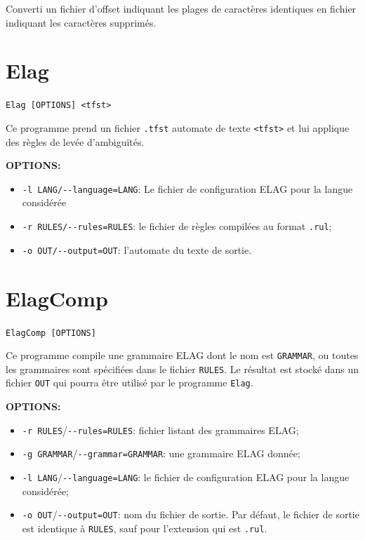 Converti un fichier d'offset indiquant les plages de caractères identiques en fichier indiquant les caractères supprimés.






\section{Elag}
\verb+Elag [OPTIONS] <tfst>+

\bigskip
\noindent Ce programme prend un fichier \verb+.tfst+ automate de texte \verb+<tfst>+ et lui applique
des règles de levée d’ambiguïtés. 

\bigskip
\noindent \textbf{OPTIONS:}
\begin{itemize}
\item \verb+-l LANG/--language=LANG+: Le fichier de configuration ELAG pour la langue considérée
  \item \verb+-r RULES/--rules=RULES+: le fichier de règles compilées au format \verb+.rul+;
  \item \verb+-o OUT/--output=OUT+: l’automate du texte de sortie.
\end{itemize}







\section{ElagComp}
\verb+ElagComp [OPTIONS]+

\bigskip
\noindent Ce programme compile une grammaire ELAG dont le nom est \verb+GRAMMAR+,  ou toutes les grammaires sont spécifiées dans le fichier \verb+RULES+. Le résultat est stocké dans un fichier \verb+OUT+ qui pourra être utilisé par le programme \verb+Elag+.

\bigskip
\noindent \textbf{OPTIONS:}
\begin{itemize}
  \item \verb+-r RULES+/\verb+--rules=RULES+: fichier listant des grammaires ELAG;
  \item \verb+-g GRAMMAR+/\verb+--grammar=GRAMMAR+: une grammaire ELAG donnée;
  \item \verb+-l LANG+/\verb+--language=LANG+: le fichier de configuration ELAG pour la langue
  	  considérée;
  \item \verb+-o OUT+/\verb+--output=OUT+: nom du fichier de sortie. Par défaut, le fichier de
  	  sortie est identique à \verb+RULES+, sauf pour l’extension qui est
  	  \verb+.rul+.
\end{itemize}








